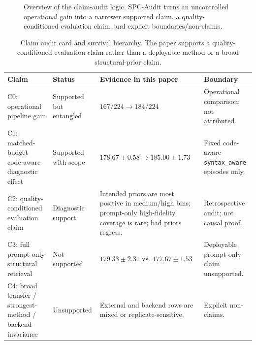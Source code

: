 \documentclass{article}
\newcommand{\code}[1]{\texttt{#1}}
\begin{document}
\begin{figure}[H]
{%
}
\caption{Overview of the claim-audit logic. SPC-Audit turns an uncontrolled operational gain into a narrower supported claim, a quality-conditioned evaluation claim, and explicit boundaries/non-claims.}
\label{fig:claim-audit}
\end{figure}

\begin{table}[H]
\caption{Claim audit card and survival hierarchy. The paper supports a quality-conditioned evaluation claim rather than a deployable method or a broad structural-prior claim.}
\label{tab:claim-card}
\centering
\scriptsize
\begin{tabularx}{\linewidth}{l l Y Y}
\toprule
Claim & Status & Evidence in this paper & Boundary \\
\midrule
C0: operational pipeline gain & Supported but entangled & $167/224 \rightarrow 184/224$ & Operational comparison; not attributed. \\
C1: matched-budget code-aware diagnostic effect & Supported with scope & $178.67 \pm 0.58 \rightarrow 185.00 \pm 1.73$ & Fixed code-aware \code{syntax\_aware} episodes only. \\
C2: quality-conditioned evaluation claim & Diagnostic support & Intended priors are most positive in medium/high bins; prompt-only high-fidelity coverage is rare; bad priors regress. & Retrospective audit; not causal proof. \\
C3: full prompt-only structural retrieval & Not supported & $179.33 \pm 2.31$ vs. $177.67 \pm 1.53$ & Deployable prompt-only claim unsupported. \\
C4: broad transfer / strongest-method / backend-invariance & Unsupported & External and backend rows are mixed or replicate-sensitive. & Explicit non-claims. \\
\bottomrule
\end{tabularx}
\end{table}
\end{document}
